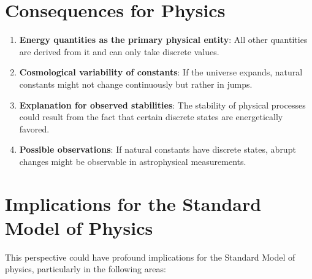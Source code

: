 \documentclass{article}
\begin{document}
	\section{Consequences for Physics}
	
	\begin{enumerate}
		\item \textbf{Energy quantities as the primary physical entity}: All other quantities are derived from it and can only take discrete values.
		\item \textbf{Cosmological variability of constants}: If the universe expands, natural constants might not change continuously but rather in jumps.
		\item \textbf{Explanation for observed stabilities}: The stability of physical processes could result from the fact that certain discrete states are energetically favored.
		\item \textbf{Possible observations}: If natural constants have discrete states, abrupt changes might be observable in astrophysical measurements.
	\end{enumerate}
	
	\section{Implications for the Standard Model of Physics}
	
	This perspective could have profound implications for the Standard Model of physics, particularly in the following areas:
	
\end{document}
